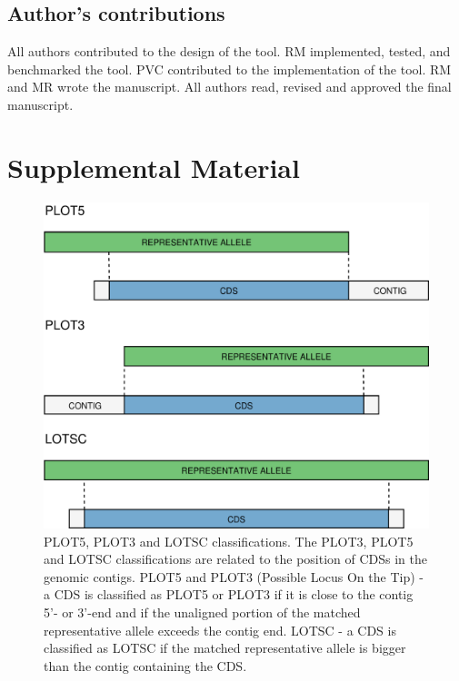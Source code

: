\subsection{Author’s contributions} \label{ssec:declarations_ssec6}

All authors contributed to the design of the tool. RM implemented, tested, and benchmarked the tool. PVC contributed to the implementation of the tool. RM and MR wrote the manuscript. All authors read, revised and approved the final manuscript.




% 

\newpage

\section{Supplemental Material}

\begin{figure}[h!]
    \centering
    \includegraphics[angle=0,width=\textwidth]{figures/chapter 2/FigureS1.pdf}
    \caption{PLOT5, PLOT3 and LOTSC classifications. The PLOT3, PLOT5 and LOTSC classifications are related to the position of CDSs in the genomic contigs. PLOT5 and PLOT3 (Possible Locus On the Tip) - a CDS is classified as PLOT5 or PLOT3 if it is close to the contig 5’- or 3’-end and if the unaligned portion of the matched representative allele exceeds the contig end. LOTSC - a CDS is classified as LOTSC if the matched representative allele is bigger than the contig containing the CDS.}
    \label{fig:chap2_figureS1}
\end{figure}

